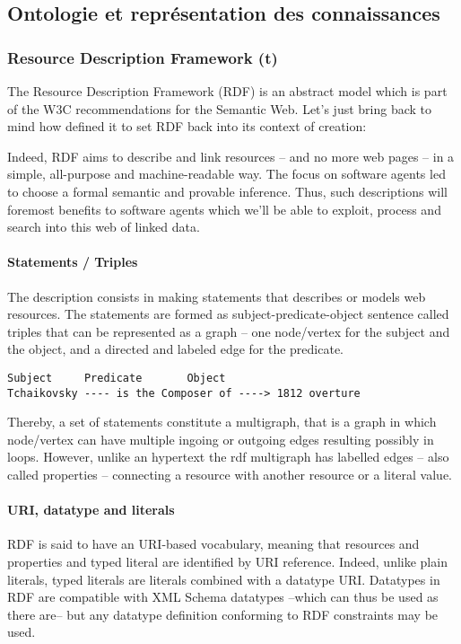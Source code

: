 \subsection{Ontologie et représentation des connaissances}
\subsubsection{Resource Description Framework (t)}
The Resource  Description Framework (RDF) is an abstract model which is part of the W3C recommendations for the Semantic Web. 
Let's just bring back to mind how  defined it to set RDF back into its context of creation: 


Indeed, RDF aims to describe and link resources – and no more web pages – in a simple, all-purpose and machine-readable way. 
The focus on software agents led to choose a formal semantic and provable inference. 
Thus, such descriptions will foremost benefits to software agents which we'll be able to exploit, process and search into this web of linked data. 

\paragraph{Statements / Triples}
The description consists in making statements that describes or models web resources. The statements are formed as subject-predicate-object sentence called triples that can be represented as a graph – one node/vertex for the subject and the object, and a directed and labeled edge for the predicate. 
\begin{Verbatim}[fontsize=\small,formatcom=\color{black!70}]
Subject		Predicate	    Object	
Tchaikovsky ---- is the Composer of ----> 1812 overture
\end{Verbatim}
Thereby, a set of statements constitute a multigraph, that is a graph in which node/vertex can have multiple ingoing or outgoing edges resulting possibly in loops. 
However, unlike an hypertext the rdf multigraph has labelled edges – also called properties -- connecting a resource with another resource or a literal value.

\paragraph{URI, datatype and literals}
RDF is said to have an URI-based vocabulary, meaning that resources and properties and typed literal are identified by URI reference. 
Indeed, unlike plain literals, typed literals are literals combined with a datatype URI.
Datatypes in RDF are compatible with XML Schema datatypes --which can thus be used as there are-- but any datatype definition conforming to RDF constraints may be used.

